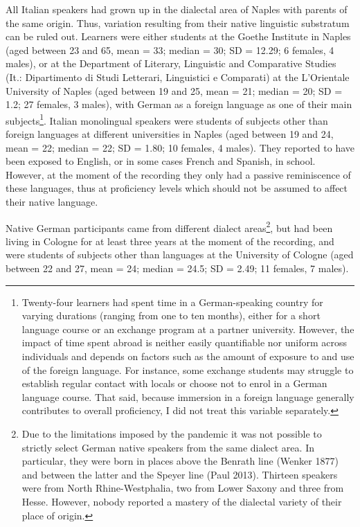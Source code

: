 \begin{styleStandard}
All Italian speakers had grown up in the dialectal area of Naples with parents of the same origin. Thus, variation resulting from their native linguistic substratum can be ruled out. Learners were either students at the Goethe Institute in Naples (aged between 23 and 65, mean = 33; median = 30; SD = 12.29; 6 females, 4 males), or at the Department of Literary, Linguistic and Comparative Studies (It.: Dipartimento di Studi Letterari, Linguistici e Comparati) at the L’Orientale University of Naples (aged between 19 and 25, mean = 21; median = 20; SD = 1.2; 27 females, 3 males), with German as a foreign language as one of their main subjects\footnote{Twenty-four learners had spent time in a German-speaking country for varying durations (ranging from one to ten months), either for a short language course or an exchange program at a partner university. However, the impact of time spent abroad is neither easily quantifiable nor uniform across individuals and depends on factors such as the amount of exposure to and use of the foreign language. For instance, some exchange students may struggle to establish regular contact with locals or choose not to enrol in a German language course. That said, because immersion in a foreign language generally contributes to overall proficiency, I did not treat this variable separately.}. Italian monolingual speakers were students of subjects other than foreign languages at different universities in Naples (aged between 19 and 24, mean = 22; median = 22; SD = 1.80; 10 females, 4 males). They reported to have been exposed to English, or in some cases French and Spanish, in school. However, at the moment of the recording they only had a passive reminiscence of these languages, thus at proficiency levels which should not be assumed to affect their native language.
\end{styleStandard}

\begin{styleStandard}
Native German participants came from different dialect areas\footnote{Due to the limitations imposed by the pandemic it was not possible to strictly select German native speakers from the same dialect area. In particular, they were born in places above the Benrath line (Wenker 1877) and between the latter and the Speyer line (Paul 2013). Thirteen speakers were from North Rhine-Westphalia, two from Lower Saxony and three from Hesse. However, nobody reported a mastery of the dialectal variety of their place of origin.}, but had been living in Cologne for at least three years at the moment of the recording, and were students of subjects other than languages at the University of Cologne (aged between 22 and 27, mean = 24; median = 24.5; SD = 2.49; 11 females, 7 males).
\end{styleStandard}

